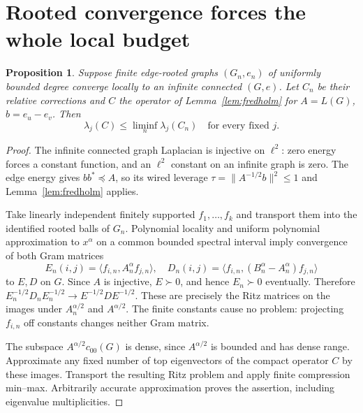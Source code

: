 \documentclass[11pt]{article}
\newtheorem{proposition}[theorem]{Proposition}
\begin{document}
\section{Rooted convergence forces the whole local budget}
\begin{proposition}\label{prop:ritz}
Suppose finite edge-rooted graphs $(G_n,e_n)$ of uniformly bounded
degree converge locally to an infinite connected $(G,e)$. Let $C_n$
be their relative corrections and $C$ the operator of
Lemma~\ref{lem:fredholm} for $A=L(G)$, $b=e_u-e_v$. Then
\[
                 \lambda_j(C)\le\liminf_n\lambda_j(C_n)
                 \quad\text{for every fixed }j.
\]
\end{proposition}
\begin{proof}
The infinite connected graph Laplacian is injective on $\ell^2$:
zero energy forces a constant function, and an $\ell^2$ constant on
an infinite graph is zero. The edge energy gives $bb^*\preceq A$,
so its wired leverage $\tau=\|A^{-1/2}b\|^2\le1$ and
Lemma~\ref{lem:fredholm} applies.

Take linearly independent finitely supported $f_1,\ldots,f_k$ and
transport them into the identified rooted balls of $G_n$. Polynomial
locality and uniform polynomial approximation to $x^\alpha$ on a
common bounded spectral interval imply convergence of both Gram
matrices
\[
 E_n(i,j)=\langle f_{i,n},A_n^\alpha f_{j,n}\rangle,
 \quad D_n(i,j)=\langle f_{i,n},(B_n^\alpha-A_n^\alpha)f_{j,n}\rangle
\]
to $E,D$ on $G$. Since $A$ is injective, $E\succ0$, and hence
$E_n\succ0$ eventually. Therefore
$E_n^{-1/2}D_nE_n^{-1/2}\to E^{-1/2}DE^{-1/2}$.
These are precisely the Ritz matrices on the images under
$A_n^{\alpha/2}$ and $A^{\alpha/2}$. The finite constants cause no
problem: projecting $f_{i,n}$ off constants changes neither Gram matrix.

The subspace $A^{\alpha/2}c_{00}(G)$ is dense, since $A^{\alpha/2}$
is bounded and has dense range. Approximate any fixed number of top
eigenvectors of the compact operator $C$ by these images. Transport
the resulting Ritz problem and apply finite compression min--max.
Arbitrarily accurate approximation proves the assertion, including
eigenvalue multiplicities.
\end{proof}
\end{document}
